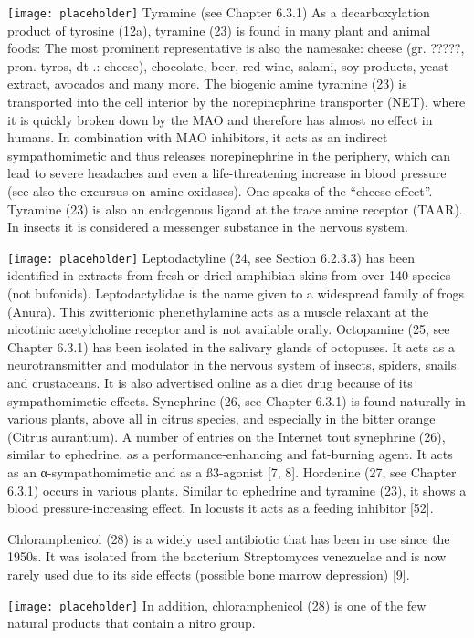 \texttt{[image: placeholder]}
Tyramine (see Chapter 6.3.1) As a decarboxylation product of tyrosine (12a), tyramine (23) is found in many plant and animal foods: The most prominent representative is also the namesake: cheese (gr. ?????, pron. tyros, dt .: cheese), chocolate, beer, red wine, salami, soy products, yeast extract, avocados and many more. The biogenic amine tyramine (23) is transported into the cell interior by the norepinephrine transporter (NET), where it is quickly broken down by the MAO and therefore has almost no effect in humans. In combination with MAO inhibitors, it acts as an indirect sympathomimetic and thus releases norepinephrine in the periphery, which can lead to severe headaches and even a life-threatening increase in blood pressure (see also the excursus on amine oxidases). One speaks of the “cheese effect”. Tyramine (23) is also an endogenous ligand at the trace amine receptor (TAAR). In insects it is considered a messenger substance in the nervous system.

\texttt{[image: placeholder]}
Leptodactyline (24, see Section 6.2.3.3) has been identified in extracts from fresh or dried amphibian skins from over 140 species (not bufonids). Leptodactylidae is the name given to a widespread family of frogs (Anura). This zwitterionic phenethylamine acts as a muscle relaxant at the nicotinic acetylcholine receptor and is not available orally. Octopamine (25, see Chapter 6.3.1) has been isolated in the salivary glands of octopuses. It acts as a neurotransmitter and modulator in the nervous system of insects, spiders, snails and crustaceans. It is also advertised online as a diet drug because of its sympathomimetic effects. Synephrine (26, see Chapter 6.3.1) is found naturally in various plants, above all in citrus species, and especially in the bitter orange (Citrus aurantium). A number of entries on the Internet tout synephrine (26), similar to ephedrine, as a performance-enhancing and fat-burning agent. It acts as an α-sympathomimetic and as a ß3-agonist [7, 8]. Hordenine (27, see Chapter 6.3.1) occurs in various plants. Similar to ephedrine and tyramine (23), it shows a blood pressure-increasing effect. In locusts it acts as a feeding inhibitor [52].
\bigbreak

Chloramphenicol (28) is a widely used antibiotic that has been in use since the 1950s. It was isolated from the bacterium Streptomyces venezuelae and is now rarely used due to its side effects (possible bone marrow depression) [9].
\clearpage

\texttt{[image: placeholder]}
In addition, chloramphenicol (28) is one of the few natural products that contain a nitro group.

